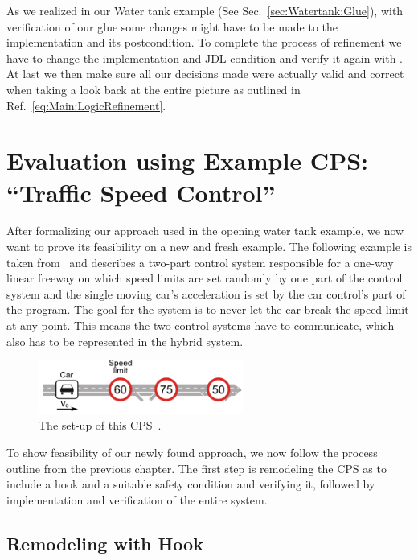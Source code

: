 As we realized in our Water tank example (See Sec.~\ref{sec:Watertank:Glue}), with verification of our glue some changes might have to be made to the implementation and its postcondition. To complete the process of refinement we have to change the implementation and JDL condition and verify it again with \key. At last we then make sure all our decisions made were actually valid and correct when taking a look back at the entire picture as outlined in Ref.~\ref{eq:Main:LogicRefinement}.


\chapter{Evaluation using Example CPS: ``Traffic Speed Control''}
\label{ch:Traffic}

After formalizing our approach used in the opening water tank example, we now want to prove its feasibility on a new and fresh example. The following example is taken from~\cite{TrafficControl} and describes a two-part control system responsible for a one-way linear freeway on which speed limits are set randomly by one part of the control system and the single moving car's acceleration is set by the car control's part of the program. The goal for the system is to never let the car break the speed limit at any point. This means the two control systems have to communicate, which also has to be represented in the hybrid system.  

\begin{figure}[h!]
	\centering
	\includegraphics[width=0.6\textwidth]{images/trafficControl}
	\caption{The set-up of this CPS~\cite{keymaera}.}
	\label{fig:trafficControl}
\end{figure}

To show feasibility of our newly found approach, we now follow the process outline from the previous chapter. The first step is remodeling the CPS as to include a hook and a suitable safety condition and verifying it, followed by implementation and verification of the entire system. 

\section{Remodeling with Hook}
\label{sec:traffic:hook}

